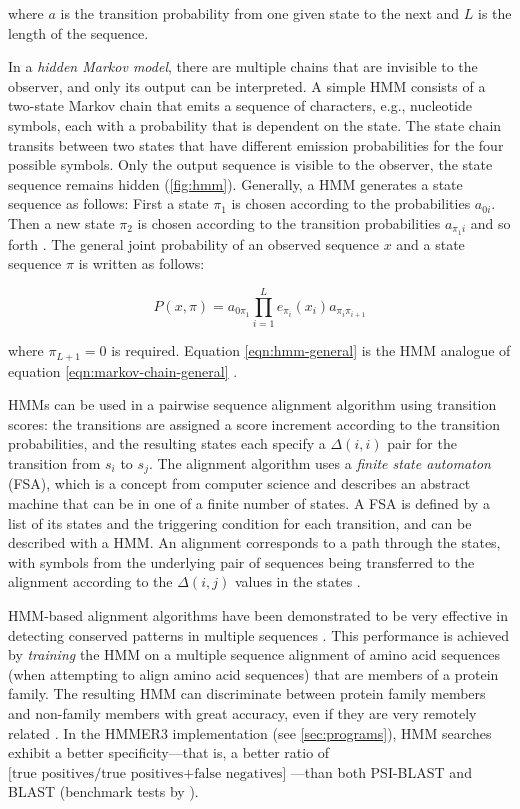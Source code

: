 where $a$ is the transition probability from one given state to the next and $L$
is the length of the sequence.

In a \emph{hidden Markov model}, there are multiple chains that are invisible to
the observer, and only its output can be interpreted. A simple HMM consists of a
two-state Markov chain that emits a sequence of characters, e.g., nucleotide
symbols, each with a probability that is dependent on the state. The state chain
transits between two states that have different emission probabilities for the
four possible symbols. Only the output sequence is visible to the observer, the
state sequence remains hidden (\autoref{fig:hmm}).
Generally, a HMM generates a state sequence as follows: First a state $\pi_1$ is
chosen according to the probabilities $a_{0i}$. Then a new state $\pi_2$ is
chosen according to the transition probabilities $a_{\pi_{1}i}$ and so forth
\citep{durbin1998}. The general joint probability of an observed sequence $x$
and a state sequence $\pi$ is written as follows:

\begin{equation}
P(x,\pi) = a_{0\pi_1} \prod_{i=1}^L e_{\pi_i}(x_i)a_{\pi_i\pi_{i+1}}
\label{eqn:hmm-general}
\end{equation}

where $\pi_{L+1} = 0$ is required. Equation \eqref{eqn:hmm-general} is the HMM
analogue of equation \eqref{eqn:markov-chain-general} \citep{durbin1998}.



HMMs can be used in a pairwise sequence alignment algorithm using transition
scores: the transitions are assigned a score increment according to the
transition probabilities, and the resulting states each specify a $\Delta(i,i)$
pair for the transition from $s_i$ to $s_j$. The alignment algorithm uses a
\emph{finite state automaton} (FSA), which is a concept from computer science
and describes an abstract machine that can be in one of a finite number of
states. A FSA is defined by a list of its states and the triggering condition
for each transition, and can be described with a HMM. An alignment corresponds
to a path through the states, with symbols from the underlying pair of sequences
being transferred to the alignment according to the $\Delta(i,j)$ values in the
states \citep{durbin1998}. 

HMM-based alignment algorithms have been demonstrated to be very effective in
detecting conserved patterns in multiple sequences \citep{eddy1995, hughey1996}.
This performance is achieved by \emph{training} the HMM on a multiple sequence
alignment of amino acid sequences (when attempting to align amino acid
sequences) that are members of a protein family. The resulting HMM can
discriminate between protein family members and non-family members with great
accuracy, even if they are very remotely related \citep{karplus1998}. In the
HMMER3 implementation (see \autoref{sec:programs}), HMM searches exhibit a
better specificity---that is, a better ratio of $\textrm{[true positives/true
positives+false negatives]}$ \citep{korf2004}---than both PSI-BLAST
\citep{altschul1997} and BLAST \citep{altschul1990} (benchmark tests by
\citet{eddy2009}).

